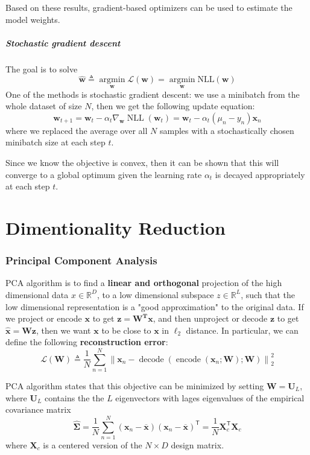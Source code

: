 \documentclass[11pt]{article}
\begin{document}
Based on these results, gradient-based optimizers can be used to estimate the model weights.

\subsubsection{Stochastic gradient descent}

The goal is to solve
\[
\hat{\boldsymbol{w}} \triangleq \operatorname*{argmin}_{\boldsymbol{w}} \mathcal{L}(\boldsymbol{w}) = \operatorname*{argmin}_{\boldsymbol{w}} \text{NLL}({\mathbf{w}})
\]
One of the methods is stochastic gradient descent: we use a minibatch from the whole dataset of size $N$, then we get the following update equation:
\[
\mathbf{w}_{t+1}
= \mathbf{w}_t - \alpha_t \nabla_{\mathbf{w}}\operatorname{NLL}(\mathbf{w}_t)
= \mathbf{w}_t - \alpha_t(\mu_n - y_n)\mathbf{x}_n
\]
where we replaced the average over all $N$ samples with a stochastically chosen minibatch size at each step $t$.

Since we know the objective is convex, then it can be shown that this will converge to a global optimum given the learning rate $\alpha_t$ is decayed appropriately at each step $t$.

\clearpage
\part{Dimentionality Reduction}
\section{Principal Component Analysis}
PCA algorithm is to find a \textbf{linear and orthogonal} projection of the high dimensional
data $x \in \mathbb{R}^D$, to a low dimensional subspace $z \in \mathbb{R}^L$, such that the low dimensional representation is a "good approximation" to the original data. If we project or encode $\mathbf{x}$ to get $\mathbf{z= W^T x}$, and then unproject or decode $\mathbf{z}$ to get $\mathbf{\hat{x}= Wz}$, then we want $\mathbf{x}$ to be close to $\mathbf{x}$ in $\ell_2$ distance. In particular, we can define the following \textbf{reconstruction error}:
\[
\mathcal{L}(\mathbf{W}) \triangleq \frac{1}{N}\sum_{n=1}^{N}
\left\lVert \mathbf{x}_n - \operatorname{decode}(\operatorname{encode}(\mathbf{x}_n;\mathbf{W});\mathbf{W}) \right\rVert_2^2
\]

PCA algorithm states that this objective can be minimized by setting $\mathbf{W} = \mathbf{U}_L$, where $\mathbf{U}_L$ contains the the $L$ eigenvectors with lages eigenvalues of the empirical covariance matrix 
\[
\hat{\boldsymbol{\Sigma}} = \frac{1}{N} \sum_{n=1}^N (\boldsymbol{x}_n - \overline{\boldsymbol{x}})(\boldsymbol{x}_n - \overline{\boldsymbol{x}})^\mathsf{T} = \frac{1}{N} \mathbf{X}_c^\mathsf{T}\mathbf{X}_c
\]
where $\mathbf{X}_c$ is a centered version of the $N \times D$ design matrix.
\end{document}
